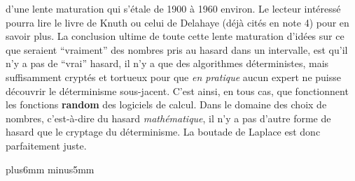 d'une lente maturation qui s'\'etale de 1900 \`a  1960 environ. Le lecteur 
int\'eress\'e pourra lire  le livre de Knuth ou celui de Delahaye 
(d\'ej\`a cit\'es en note 4) pour en savoir plus. 
\medskip
La conclusion ultime de toute cette lente maturation d'id\'ees 
sur ce  que seraient ``vraiment'' des nombres pris au hasard dans 
un intervalle, est qu'il n'y a pas de ``vrai'' hasard, il n'y a que des 
algorithmes d\'eterministes, mais suffisamment crypt\'es et tortueux 
pour que {\it en pratique} aucun expert ne puisse d\'ecouvrir le 
d\'eterminisme sous-jacent. C'est ainsi, en tous cas, que fonctionnent les 
fonctions {\bf random} des logiciels de calcul. 
\medskip 
Dans le domaine des choix de nombres, c'est-\`a-dire du hasard 
{\it math\'e\-ma\-ti\-que}, il n'y a pas d'autre forme de hasard que le 
cryptage du d\'eterminisme. La  boutade de Laplace est donc 
parfaitement juste.  
 
\vskip7mm plus6mm minus5mm
 
